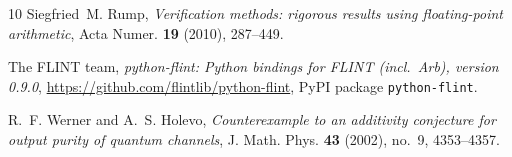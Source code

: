 \documentclass[11pt]{amsart}
\theoremstyle{definition}
\theoremstyle{remark}
\begin{document}
\begin{thebibliography}{10}
Siegfried~M. Rump, \emph{Verification methods: rigorous results using
  floating-point arithmetic}, Acta Numer. \textbf{19} (2010), 287--449.

{The FLINT team}, \emph{python-flint: {P}ython bindings for {FLINT} (incl.\
  {A}rb), version 0.9.0}, \url{https://github.com/flintlib/python-flint}, PyPI
  package \texttt{python-flint}.

R.~F. Werner and A.~S. Holevo, \emph{Counterexample to an additivity conjecture
  for output purity of quantum channels}, J. Math. Phys. \textbf{43} (2002),
  no.~9, 4353--4357.

\end{thebibliography}
\end{document}
